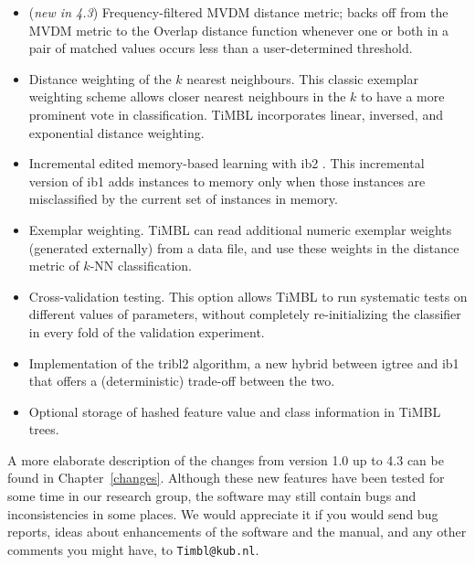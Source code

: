 \documentclass{report}
\begin{document}
\begin{itemize}

\item ({\em new in 4.3}) Frequency-filtered MVDM distance metric;
backs off from the MVDM metric to the Overlap distance function
whenever one or both in a pair of matched values occurs less than a
user-determined threshold.

\item Distance weighting of the $k$ nearest neighbours. This classic
exemplar weighting scheme \cite{Dudani76} allows closer nearest
neighbours in the $k$ to have a more prominent vote in
classification. TiMBL incorporates linear, inversed, and exponential
distance weighting.

\item Incremental edited memory-based learning with {\sc ib2}
\cite{Aha+91}. This incremental version of {\sc ib1} adds instances to
memory only when those instances are misclassified by the current set
of instances in memory.


\item Exemplar weighting. TiMBL can read additional numeric exemplar
weights (generated externally) from a data file, and use these
weights in the distance metric of $k$-NN classification.

\item Cross-validation testing. This option allows TiMBL to run
systematic tests on different values of parameters, without completely
re-initializing the classifier in every fold of the validation experiment.

\item Implementation of the {\sc tribl2} algorithm, a new hybrid
between {\sc igtree} and {\sc ib1} that offers a (deterministic)
trade-off between the two.

\item Optional storage of hashed feature value and class information
in TiMBL trees.

\end{itemize}

A more elaborate description of the changes from version 1.0 up to 4.3
can be found in Chapter~\ref{changes}. Although these new features
have been tested for some time in our research group, the software may
still contain bugs and inconsistencies in some places. We would
appreciate it if you would send bug reports, ideas about enhancements
of the software and the manual, and any other comments you might have,
to {\tt Timbl@kub.nl}.
\end{document}
